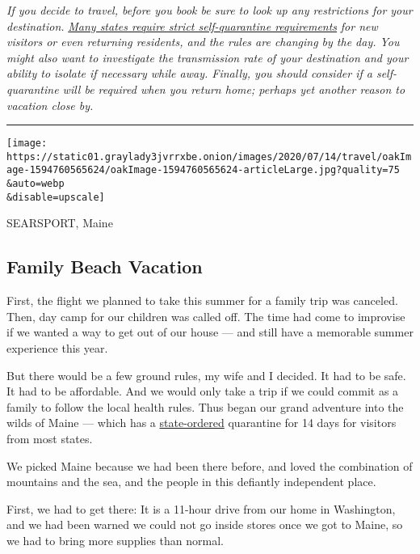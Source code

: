 \emph{If you decide to travel, before you book be sure to look up any
restrictions for your destination.}
\href{http://nytimes3xbfgragh.onion/2020/07/10/travel/state-travel-restrictions.html}{\emph{Many
states require strict self-quarantine requirements}} \emph{for new
visitors or even returning residents, and the rules are changing by the
day. You might also want to investigate the transmission rate of your
destination and your ability to isolate if necessary while away.
Finally, you should consider if a self-quarantine will be required when
you return home; perhaps yet another reason to vacation close by.}

\begin{center}\rule{0.5\linewidth}{\linethickness}\end{center}

\texttt{[image: https://static01.graylady3jvrrxbe.onion/images/2020/07/14/travel/oakImage-1594760565624/oakImage-1594760565624-articleLarge.jpg?quality=75\\\&auto=webp\\\&disable=upscale]}

SEARSPORT, Maine

\hypertarget{family-beach-vacation}{%
\subsection{Family Beach Vacation}\label{family-beach-vacation}}

First, the flight we planned to take this summer for a family trip was
canceled. Then, day camp for our children was called off. The time had
come to improvise if we wanted a way to get out of our house --- and
still have a memorable summer experience this year.

But there would be a few ground rules, my wife and I decided. It had to
be safe. It had to be affordable. And we would only take a trip if we
could commit as a family to follow the local health rules. Thus began
our grand adventure into the wilds of Maine --- which has a
\href{https://www.maine.gov/governor/mills/sites/maine.gov.governor.mills/files/inline-files/An\%20Order\%20Establishing\%20Quarantine\%20Restrictions\%20On\%20Travelers\%20Arriving\%20in\%20Maine.pdf}{state-ordered}
quarantine for 14 days for visitors from most states.

We picked Maine because we had been there before, and loved the
combination of mountains and the sea, and the people in this defiantly
independent place.

First, we had to get there: It is a 11-hour drive from our home in
Washington, and we had been warned we could not go inside stores once we
got to Maine, so we had to bring more supplies than normal.

